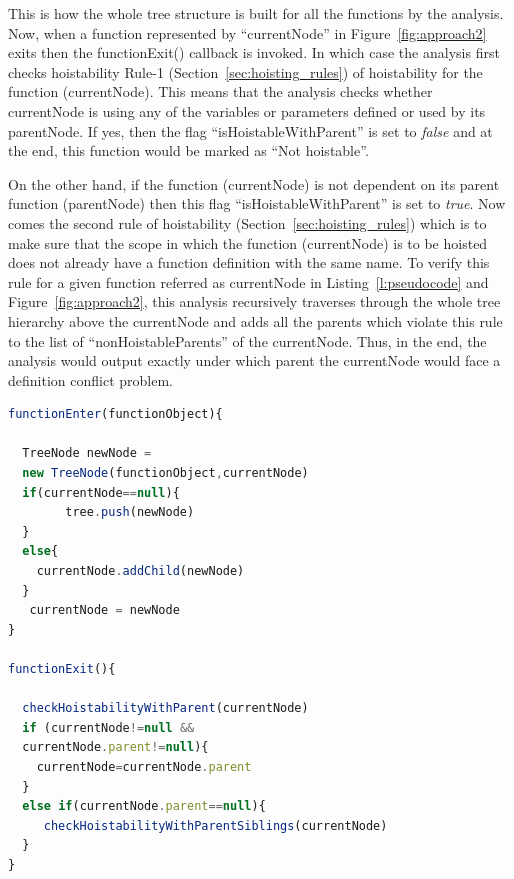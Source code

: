 \documentclass[authoryear,preprint]{sigplanconf}
\begin{document}
This is how the whole tree structure is built for all the functions by the analysis. Now, when a function represented by \enquote{currentNode} in Figure~\ref{fig:approach2} exits then the functionExit() callback is invoked. In which case the analysis first checks hoistability Rule-1 (Section~\ref{sec:hoisting_rules}) of hoistability for the function (currentNode). This means that the analysis checks whether currentNode is using any of the variables or parameters defined or used by its parentNode. If yes, then the flag \enquote{isHoistableWithParent} is set to \textit{false} and at the end, this function would be marked as \enquote{Not hoistable}.\par
On the other hand, if the function (currentNode) is not dependent on its parent function (parentNode) then this flag \enquote{isHoistableWithParent} is set to \textit{true}. Now comes the second rule of hoistability (Section~\ref{sec:hoisting_rules}) which is to make sure that the scope in which the function (currentNode) is to be hoisted does not already have a function definition with the same name. To verify this rule for a given function referred as currentNode in Listing~\ref{l:pseudocode} and Figure~\ref{fig:approach2}, this analysis recursively traverses through the whole tree hierarchy above the currentNode and adds all the parents which violate this rule to the list of \enquote{nonHoistableParents} of the currentNode. Thus, in the end, the analysis would output exactly under which parent the currentNode would face a definition conflict problem.

\lstset{numbers=left, numberstyle=\tiny, stepnumber=1, numbersep=5pt}
\lstset{basicstyle=\ttfamily}
\lstset{frame=tb, frame=bottomline}

\begin{lstlisting}[float,caption= Pseudocode of the Analysis ,label=l:pseudocode,language=JavaScript]
functionEnter(functionObject){

  TreeNode newNode = 
  new TreeNode(functionObject,currentNode)
  if(currentNode==null){
		tree.push(newNode)
  }
  else{
  	currentNode.addChild(newNode)
  }
   currentNode = newNode
}

functionExit(){

  checkHoistabilityWithParent(currentNode)
  if (currentNode!=null && 
  currentNode.parent!=null){
	currentNode=currentNode.parent
  }
  else if(currentNode.parent==null){
     checkHoistabilityWithParentSiblings(currentNode)
  }
}
\end{lstlisting} 
\end{document}
